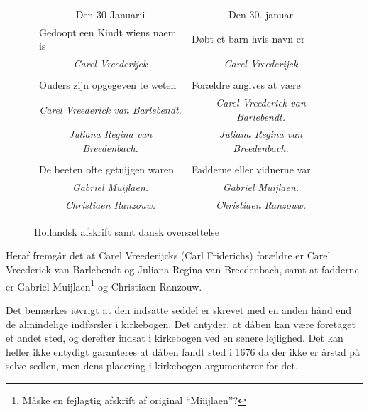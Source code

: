 \documentclass[
	a4paper,
	12pt,
	final
]{memoir}
\begin{document}
\begin{figure}[H]%
	\centerfloat%
	\colorbox{tablebkg}{%
	\begin{tabular}{p{} | p{}}
		\multicolumn{1}{c|}{Den 30 Januarii} & \multicolumn{1}{c}{Den 30. januar} \\
		Gedoopt een Kindt wiens naem is & Døbt et barn hvis navn er \\
		\multicolumn{1}{c|}{\larger \emph{Carel Vreederĳck}} & \multicolumn{1}{c}{\larger \emph{Carel Vreederĳck}} \\ %
		& \\
		Ouders zĳn opgegeven te weten & Forældre angives at være \\
		\multicolumn{1}{c|}{\emph{Carel Vreederick van Barlebendt.}} & \multicolumn{1}{c}{\emph{Carel Vreederick van Barlebendt.}} \\
		\multicolumn{1}{c|}{\emph{Juliana Regina van Breedenbach.}} & \multicolumn{1}{c}{\emph{Juliana Regina van Breedenbach.}} \\
		& \\
		De beeten ofte getuĳgen waren & Fadderne eller vidnerne var \\
		\multicolumn{1}{c|}{\emph{Gabriel Muĳlaen.}} & \multicolumn{1}{c}{\emph{Gabriel Muĳlaen.}} \\
		\multicolumn{1}{c|}{\emph{Christiaen Ranzouw.}} & \multicolumn{1}{c}{\emph{Christiaen Ranzouw.}} \\
	\end{tabular}}%
	\caption{Hollandsk afskrift samt dansk oversættelse}%
\end{figure}%


Heraf fremgår det at Carel Vreederijcks (Carl Friderichs) forældre er Carel Vreederick van Barlebendt og Juliana Regina van Breedenbach, samt at fadderne er Gabriel Muĳlaen\footnote{Måske en fejlagtig afskrift af original \enquote{Miiĳlaen}?} og Christiaen Ranzouw.

Det bemærkes iøvrigt at den indsatte seddel er skrevet med en anden hånd end de almindelige indførsler i kirkebogen. Det antyder, at dåben kan være foretaget et andet sted, og derefter indsat i kirkebogen ved en senere lejlighed. Det kan heller ikke entydigt garanteres at dåben fandt sted i 1676 da der ikke er årstal på selve sedlen, men dens placering i kirkebogen argumenterer for det.

\end{document}
